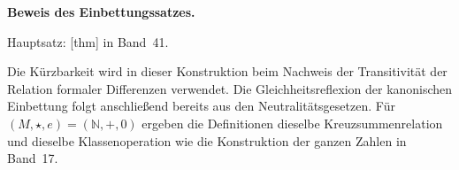 \par{}
\hypertarget{differences.proof}{}
\noindent\textbf{Beweis des Einbettungssatzes.}\par\nobreak
\noindent Hauptsatz: [thm]
in Band~41.\par\medskip

\begin{tabproofwide}
\end{tabproofwide}

\begin{remark}
Die Kürzbarkeit wird in dieser Konstruktion beim Nachweis der Transitivität
der Relation formaler Differenzen verwendet. Die Gleichheitsreflexion der
kanonischen Einbettung folgt anschließend bereits aus den Neutralitätsgesetzen.
Für \((M,\star,e)=(\mathbb N,+,0)\) ergeben die Definitionen dieselbe
Kreuzsummenrelation und dieselbe Klassenoperation wie die Konstruktion der
ganzen Zahlen in Band~17.
\end{remark}

